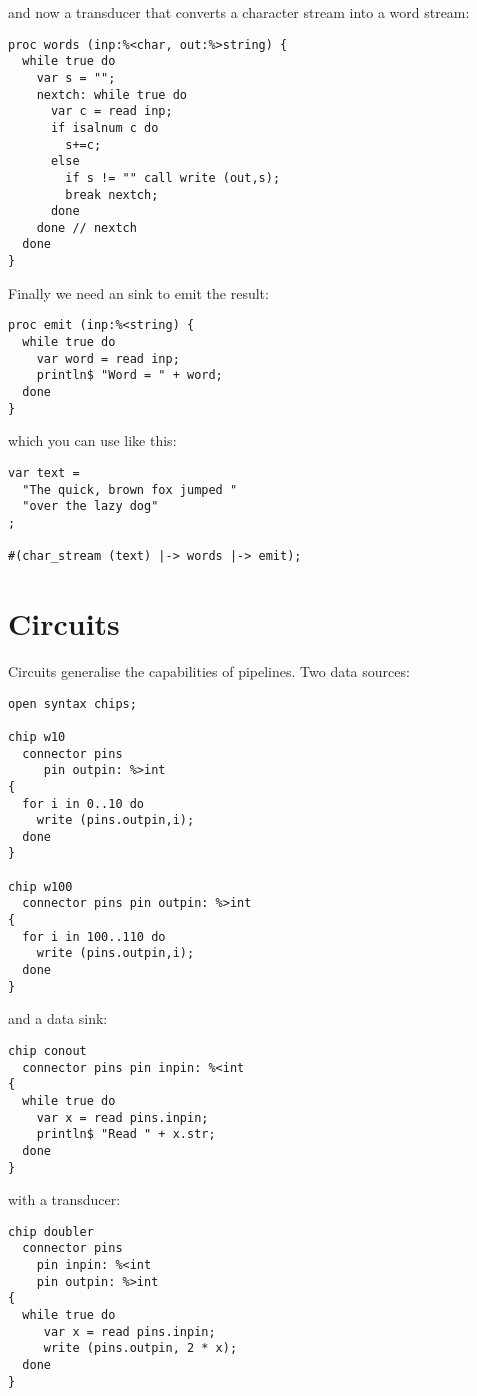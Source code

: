 \documentclass[oneside]{book}
\begin{document}
and now a transducer that converts a character
stream into a word stream:

\begin{verbatim}
proc words (inp:%<char, out:%>string) {
  while true do
    var s = "";
    nextch: while true do
      var c = read inp;
      if isalnum c do
        s+=c;
      else 
        if s != "" call write (out,s);
        break nextch;
      done
    done // nextch
  done
}
\end{verbatim}

Finally we need an sink to emit the result:

\begin{verbatim}
proc emit (inp:%<string) {
  while true do
    var word = read inp;
    println$ "Word = " + word;
  done
}
\end{verbatim}

which you can use like this:

\begin{verbatim}
var text = 
  "The quick, brown fox jumped "
  "over the lazy dog"
;

#(char_stream (text) |-> words |-> emit);
\end{verbatim}

\section{Circuits}

Circuits generalise the capabilities of pipelines.
Two data sources:

\begin{verbatim}
open syntax chips;

chip w10 
  connector pins
     pin outpin: %>int 
{ 
  for i in 0..10 do 
    write (pins.outpin,i);
  done
}

chip w100
  connector pins pin outpin: %>int 
{ 
  for i in 100..110 do 
    write (pins.outpin,i);
  done
}
\end{verbatim}

and a data sink:

\begin{verbatim}
chip conout 
  connector pins pin inpin: %<int 
{ 
  while true do
    var x = read pins.inpin;
    println$ "Read " + x.str;
  done
}
\end{verbatim}

with a transducer:

\begin{verbatim}
chip doubler
  connector pins 
    pin inpin: %<int
    pin outpin: %>int
{
  while true do
     var x = read pins.inpin;
     write (pins.outpin, 2 * x);
  done
}
\end{verbatim}
\end{document}
